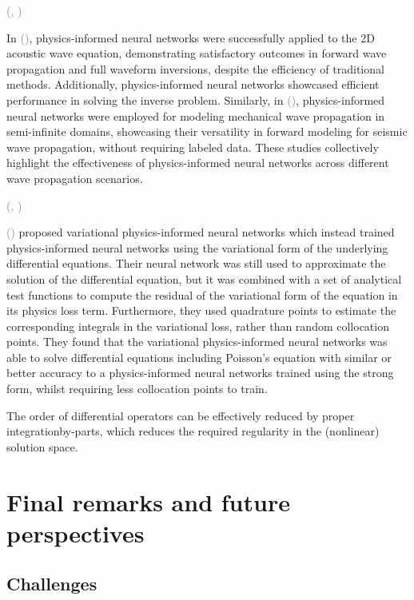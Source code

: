 \documentclass{tufte-handout}
\renewcommand{\citep}[2][]{\textcolor{gray}{(\citeauthor{#2}, \citeyear[#1]{#2})}}
\renewcommand{\citeauthoryear}[2][]{\textcolor{gray}{\citeauthor{#2} (\textcolor{gray}{\citeyear[#1]{#2}})}}
\begin{document}
\citep{alkhadhr_modeling_2021}


In \citeauthoryear{moseley_physics-informed_2022}, physics-informed neural networks were successfully applied to the 2D acoustic wave equation, demonstrating satisfactory outcomes in forward wave propagation and full waveform inversions, despite the efficiency of traditional methods. Additionally, physics-informed neural networks showcased efficient performance in solving the inverse problem. Similarly, in \citeauthoryear{ren_seismicnet_2024}, physics-informed neural networks were employed for modeling mechanical wave propagation in semi-infinite domains, showcasing their versatility in forward modeling for seismic wave propagation, without requiring labeled data. These studies collectively highlight the effectiveness of physics-informed neural networks across different wave propagation scenarios.

\citep{wu_helmholtz-equation_2023}

\citeauthoryear{kharazmi_variational_2019} proposed variational physics-informed neural networks which instead trained physics-informed neural networks using the variational form of the underlying differential equations. Their neural network was still used to approximate the solution of the differential equation, but it was combined with a set of analytical test functions to compute the residual of the variational form of the equation in its physics loss term. Furthermore, they used quadrature points to estimate the corresponding integrals in the variational loss, rather than random collocation points. They found that the variational physics-informed neural networks was able to solve differential equations including Poisson’s equation with similar or better accuracy to a physics-informed neural networks trained using the strong form, whilst requiring less collocation points to train.

The order of differential operators can be effectively reduced by proper integrationby-parts, which reduces the required regularity in the (nonlinear) solution space.




\section{Final remarks and future perspectives}\label{sec:final_remarks_and_perspectives}

\subsection{Challenges}
\end{document}
